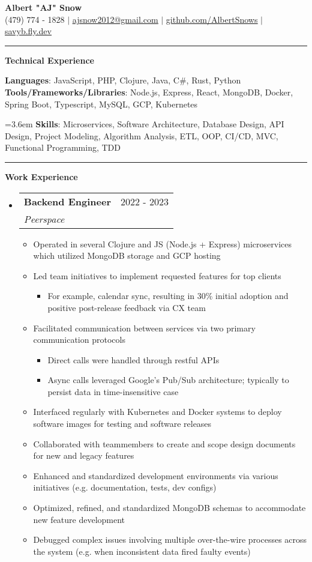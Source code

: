\documentclass[letterpaper,11pt]{article}
\makeatletter
\newcommand{\resumeItem}[1]{
  \item\small{
    {#1 \vspace{-2pt}}
  }
}
\newcommand{\resumeSubheading}[4]{
  \vspace{-2pt}\item
    \begin{tabular*}{0.97\textwidth}[t]{l@{\extracolsep{\fill}}r}
      \textbf{#1} & #2 \\
      \textit{\small#3} & \textit{\small #4} \\
    \end{tabular*}\vspace{0pt}
}
\newcommand{\resumeSubHeadingListStart}{\begin{itemize}[leftmargin=0.15cm, label={}]}
\newcommand{\resumeSubHeadingListEnd}{\end{itemize}}
\newcommand{\resumeItemListStart}{\begin{itemize}}
\newcommand{\resumeItemListEnd}{\end{itemize}\vspace{-5pt}}
\makeatother
\begin{document}
\textbf{\normalshape \Large \textcolor{magic_blue}{Albert "AJ" Snow}} \\ \vspace{3pt}
\small (479) 774 - 1828 $|$ \href{mailto:ajsnow2012@gmail.com}
{\underline{ajsnow2012@gmail.com}} $|$
\href{https://github.com/AlbertSnows}{\underline{github.com/AlbertSnows}}
$|$ \href{https://savyb.fly.dev/}{\underline{savyb.fly.dev}}
\noindent\rule{19.5cm}{0.4pt}


%
\textbf{\large \textcolor{magic_blue}{Technical Experience} }
\begin{onehalfspace}

    \textbf{ Languages}{: JavaScript, PHP, Clojure, Java, C\#, Rust, Python } \\

    \textbf{ Tools/Frameworks/Libraries}{: Node.js, Express, React, MongoDB, Docker, Spring Boot, Typescript, MySQL, GCP, Kubernetes } \\
\end{onehalfspace}

\hangindent=3.6em
\textbf{ Skills}{: }
Microservices, Software Architecture, Database Design, 
API Design, Project Modeling, Algorithm Analysis, ETL, 
OOP, CI/CD,
MVC, Functional Programming, TDD

\noindent\rule{19.5cm}{0.4pt}

\textbf{\large \textcolor{magic_blue}{Work Experience}}
\resumeSubHeadingListStart
\resumeSubheading
{Backend Engineer}{2022 - 2023}
{Peerspace}{}
\resumeItemListStart
\resumeItem{Operated in several Clojure and JS (Node.js + Express) microservices which utilized MongoDB storage and GCP hosting}
\resumeItem{ Led team initiatives to implement requested features for top clients }
\begin{itemize}
	\item For example, calendar sync, resulting in 30\% initial adoption and positive post-release feedback via CX team
\end{itemize}
\resumeItem{Facilitated communication between services via two primary communication protocols}
\begin{itemize}
	\item Direct calls were handled through restful APIs
	\item Async calls leveraged Google's Pub/Sub architecture; typically to persist data in time-insensitive case
\end{itemize}
\resumeItem{Interfaced regularly with Kubernetes and Docker systems to deploy software images for testing and software releases}
\resumeItem{Collaborated with teammembers to create and scope design documents for new and legacy features}
\resumeItem{Enhanced and standardized development environments via various initiatives (e.g. documentation, tests, dev configs)}
\resumeItem{Optimized, refined, and standardized MongoDB schemas to accommodate new feature development}
\resumeItem{Debugged complex issues involving multiple over-the-wire processes across the system (e.g. when inconsistent data fired faulty events) }
\resumeItemListEnd
\resumeSubHeadingListEnd
\end{document}
